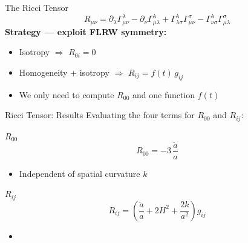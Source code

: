 \documentclass[aspectratio=169,11pt]{beamer}
\begin{document}
\begin{frame}{The Ricci Tensor}
\begin{equation*}
    R_{\mu\nu}
    = \partial_\lambda\Gamma^\lambda_{\mu\nu}
    - \partial_\nu\Gamma^\lambda_{\mu\lambda}
    + \Gamma^\lambda_{\lambda\sigma}\Gamma^\sigma_{\mu\nu}
    - \Gamma^\lambda_{\nu\sigma}\Gamma^\sigma_{\mu\lambda}
\end{equation*}
\vspace{0.3cm}
\textbf{Strategy --- exploit FLRW symmetry:}
\begin{itemize}
    \item Isotropy $\Rightarrow$ $R_{0i}=0$
    \item Homogeneity + isotropy $\Rightarrow$ $R_{ij}=f(t)\,g_{ij}$
    \item We only need to compute $R_{00}$ and one function $f(t)$
\end{itemize}
\end{frame}

\begin{frame}{Ricci Tensor: Results}
Evaluating the four terms for $R_{00}$ and $R_{ij}$:

\begin{alertblock}{$R_{00}$}
\vspace{-0.1cm}
\begin{equation*}
    R_{00} = -3\,\frac{\ddot{a}}{a}
\end{equation*}
\vspace{-0.3cm}
\end{alertblock}
\begin{itemize}
    \item Independent of spatial curvature $k$
\end{itemize}

\begin{alertblock}{$R_{ij}$}
\vspace{-0.1cm}
\begin{equation*}
    R_{ij} = \left(\frac{\ddot{a}}{a} + 2H^2 + \frac{2k}{a^2}\right)g_{ij}
\end{equation*}
\vspace{-0.3cm}
\end{alertblock}
\begin{itemize}
    \item {}
\end{itemize}
\end{frame}
\end{document}
